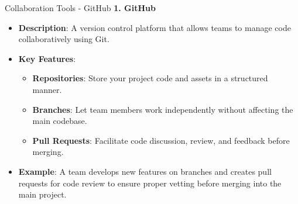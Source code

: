 \documentclass[aspectratio=169]{beamer}
\begin{document}
\begin{frame}[fragile]{Collaboration Tools - GitHub}
  \textbf{1. GitHub}  
  \begin{itemize}
    \item \textbf{Description}: A version control platform that allows teams to manage code collaboratively using Git.
    \item \textbf{Key Features}:
    \begin{itemize}
      \item \textbf{Repositories}: Store your project code and assets in a structured manner.
      \item \textbf{Branches}: Let team members work independently without affecting the main codebase.
      \item \textbf{Pull Requests}: Facilitate code discussion, review, and feedback before merging.
    \end{itemize}
    \item \textbf{Example}: A team develops new features on branches and creates pull requests for code review to ensure proper vetting before merging into the main project.
  \end{itemize}
\end{frame}
\end{document}
